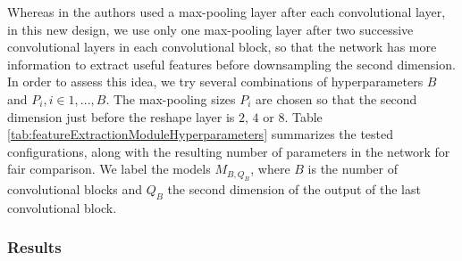 Whereas in \cite{perotin_crnn-based_2019} the authors used a max-pooling layer after each convolutional layer, in this new design, we use only one max-pooling layer after two successive convolutional layers in each convolutional block, so that the network has more information to extract useful features before downsampling the second dimension. In order to assess this idea, we try several combinations of hyperparameters $B$ and $P_i, i \in {1,...,B}$. The max-pooling sizes $P_i$ are chosen so that the second dimension just before the reshape layer is $2$, $4$ or $8$. Table \ref{tab:featureExtractionModuleHyperparameters} summarizes the tested configurations, along with the resulting number of parameters in the network for fair comparison. We label the models $M_{B,Q_B}$, where $B$ is the number of convolutional blocks and $Q_B$ the second dimension of the output of the last convolutional block.

\subsubsection{Results}


